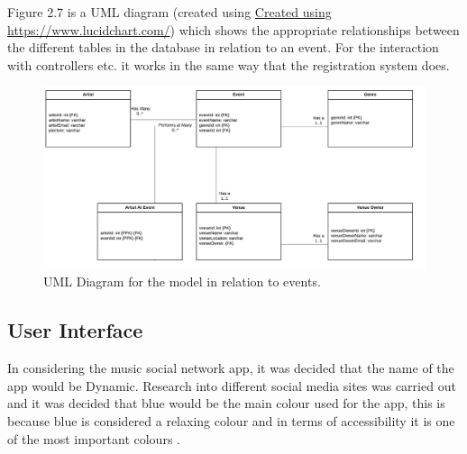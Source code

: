 Figure 2.7 is a UML diagram (created using \url{Created using https://www.lucidchart.com/}) which shows the appropriate relationships between the different tables in the database in relation to an event. For the interaction with controllers etc. it works in the same way that the registration system does.
\begin{figure}[H]
\includegraphics[width=\textwidth,height=\textheight,keepaspectratio]{images/events}
\caption{UML Diagram for the model in relation to events.}
\end{figure}


\subsection{User Interface}
In considering the music social network app, it was decided that the name of the app would be Dynamic. Research into different social media sites was carried out and it was decided that blue would be the main colour used for the app, this is because blue is considered a relaxing colour and in terms of accessibility it is one of the most important colours \cite{col}.
